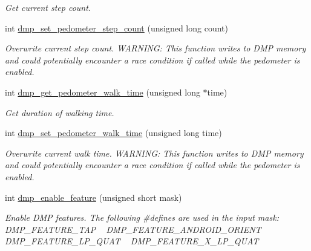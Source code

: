 \begin{DoxyCompactItemize}
\begin{DoxyCompactList}\small\item\em Get current step count. \end{DoxyCompactList}\item 
int \hyperlink{group___d_r_i_v_e_r_s_ga568562c19998f585b1d2ba056cd209db}{dmp\+\_\+set\+\_\+pedometer\+\_\+step\+\_\+count} (unsigned long count)
\begin{DoxyCompactList}\small\item\em Overwrite current step count. W\+A\+R\+N\+I\+NG\+: This function writes to D\+MP memory and could potentially encounter a race condition if called while the pedometer is enabled. \end{DoxyCompactList}\item 
int \hyperlink{group___d_r_i_v_e_r_s_ga62c8e5e99986b0e60ca0dc9a9b9c3fcc}{dmp\+\_\+get\+\_\+pedometer\+\_\+walk\+\_\+time} (unsigned long $\ast$time)
\begin{DoxyCompactList}\small\item\em Get duration of walking time. \end{DoxyCompactList}\item 
int \hyperlink{group___d_r_i_v_e_r_s_ga62f469269047f8cba16a2b7f5349acc0}{dmp\+\_\+set\+\_\+pedometer\+\_\+walk\+\_\+time} (unsigned long time)
\begin{DoxyCompactList}\small\item\em Overwrite current walk time. W\+A\+R\+N\+I\+NG\+: This function writes to D\+MP memory and could potentially encounter a race condition if called while the pedometer is enabled. \end{DoxyCompactList}\item 
int \hyperlink{group___d_r_i_v_e_r_s_ga70c485bdfa30515e5b869b081192caa1}{dmp\+\_\+enable\+\_\+feature} (unsigned short mask)
\begin{DoxyCompactList}\small\item\em Enable D\+MP features. The following \#define\textquotesingle{}s are used in the input mask\+: ~\newline
 D\+M\+P\+\_\+\+F\+E\+A\+T\+U\+R\+E\+\_\+\+T\+AP ~\newline
 D\+M\+P\+\_\+\+F\+E\+A\+T\+U\+R\+E\+\_\+\+A\+N\+D\+R\+O\+I\+D\+\_\+\+O\+R\+I\+E\+NT ~\newline
 D\+M\+P\+\_\+\+F\+E\+A\+T\+U\+R\+E\+\_\+\+L\+P\+\_\+\+Q\+U\+AT ~\newline
 D\+M\+P\+\_\+\+F\+E\+A\+T\+U\+R\+E\+\_\+X\+\_\+\+L\+P\+\_\+\+Q\+U\+AT ~\newline

\end{DoxyCompactList}
\end{DoxyCompactItemize}
